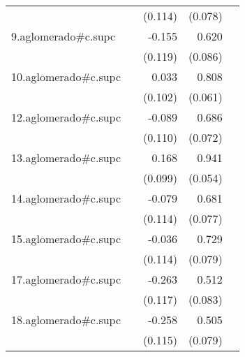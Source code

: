 {\begin{longtable}{l*{4}{D{.}{.}{-1}}}
            &                     &     (0.114)         &     (0.078)         &                     \\
\addlinespace
9.aglomerado#c.supc&                     &      -0.155         &       0.620\sym{***}&                     \\
            &                     &     (0.119)         &     (0.086)         &                     \\
\addlinespace
10.aglomerado#c.supc&                     &       0.033         &       0.808\sym{***}&                     \\
            &                     &     (0.102)         &     (0.061)         &                     \\
\addlinespace
12.aglomerado#c.supc&                     &      -0.089         &       0.686\sym{***}&                     \\
            &                     &     (0.110)         &     (0.072)         &                     \\
\addlinespace
13.aglomerado#c.supc&                     &       0.168         &       0.941\sym{***}&                     \\
            &                     &     (0.099)         &     (0.054)         &                     \\
\addlinespace
14.aglomerado#c.supc&                     &      -0.079         &       0.681\sym{***}&                     \\
            &                     &     (0.114)         &     (0.077)         &                     \\
\addlinespace
15.aglomerado#c.supc&                     &      -0.036         &       0.729\sym{***}&                     \\
            &                     &     (0.114)         &     (0.079)         &                     \\
\addlinespace
17.aglomerado#c.supc&                     &      -0.263\sym{*}  &       0.512\sym{***}&                     \\
            &                     &     (0.117)         &     (0.083)         &                     \\
\addlinespace
18.aglomerado#c.supc&                     &      -0.258\sym{*}  &       0.505\sym{***}&                     \\
            &                     &     (0.115)         &     (0.079)         &                     \\

\end{longtable}}
